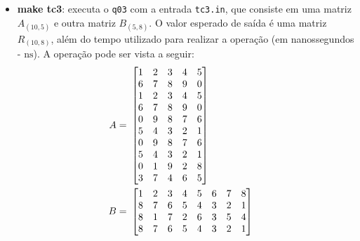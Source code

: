 \begin{itemize}
{\begin{itemize}
{\begin{align}
\begin{bmatrix}
				1 & 2 \\
				2 & 4 \\
				4 & 8 \\
				8 & 16 \\
				16 & 32
			\end{bmatrix}
			& \notag \\
			B = \ &
			\begin{bmatrix}
				1 & 3 & 6 \\
				2 & 6 & 9
			\end{bmatrix}
			& \notag \\
			R = \ & A \times B = \
			\begin{bmatrix}
				5 & 15 & 24 \\
				10 & 30 & 48 \\
				20 & 60 & 96 \\
				40 & 120 & 192 \\
				80 & 240 & 384
			\end{bmatrix}
			& \label{eq:q03_tc2}
		\end{align}
		}
		\item{\textbf{make tc3}: executa o \texttt{q03} com a entrada \texttt{tc3.in}, que consiste em uma matriz $A_{(10,5)}$ e outra matriz $B_{(5,8)}$. O valor esperado de saída é uma matriz $R_{(10,8)}$, além do tempo utilizado para realizar a operação (em nanossegundos - $\text{ns}$). A operação pode ser vista a seguir:
		\begin{align}
			A = \ &
			\begin{bmatrix}
				1 & 2 & 3 & 4 & 5 \\
				6 & 7 & 8 & 9 & 0 \\
				1 & 2 & 3 & 4 & 5 \\
				6 & 7 & 8 & 9 & 0 \\
				0 & 9 & 8 & 7 & 6 \\
				5 & 4 & 3 & 2 & 1 \\
				0 & 9 & 8 & 7 & 6 \\
				5 & 4 & 3 & 2 & 1 \\
				0 & 1 & 9 & 2 & 8 \\
				3 & 7 & 4 & 6 & 5
			\end{bmatrix}
			& \notag \\
			B = \ &
			\begin{bmatrix}
				1 & 2 & 3 & 4 & 5 & 6 & 7 & 8 \\
				8 & 7 & 6 & 5 & 4 & 3 & 2 & 1 \\
				8 & 1 & 7 & 2 & 6 & 3 & 5 & 4 \\
				8 & 7 & 6 & 5 & 4 & 3 & 2 & 1 \\

\end{bmatrix}
\end{align}}
\end{itemize}}
\end{itemize}
